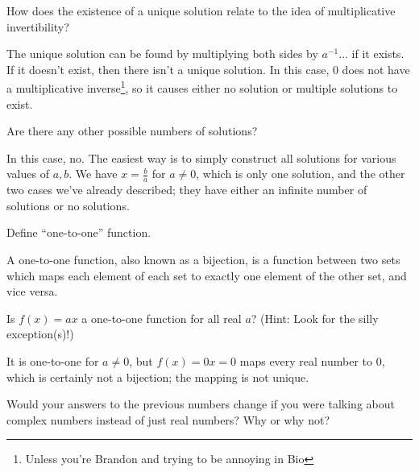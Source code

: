 \documentclass[../gatm_answers.tex]{subfiles}
\begin{document}
\begin{inner_problem}
\item How does the existence of a unique solution relate to the idea of multiplicative invertibility?
\end{inner_problem}

The unique solution can be found by multiplying both sides by $a^{-1}$... if it exists. If it doesn't exist, then there isn't a unique solution. In this case, $0$ does not have a multiplicative inverse\footnote{Unless you're Brandon and trying to be annoying in Bio}, so it causes either no solution or multiple solutions to exist.

\begin{inner_problem}
\item Are there any other possible numbers of solutions?
\end{inner_problem}

In this case, no. The easiest way is to simply construct all solutions for various values of $a,b$. We have $x=\frac{b}{a}$ for $a\neq 0$, which is only one solution, and the other two cases we've already described; they have either an infinite number of solutions or no solutions.

\begin{outer_problem}
\item
\end{outer_problem}

\begin{inner_problem}[start=1]
\item Define ``one-to-one'' function.
\end{inner_problem}

A one-to-one function, also known as a bijection, is a function between two sets which maps each element of each set to exactly one element of the other set, and vice versa.

\begin{inner_problem}
\item Is $f(x)=ax$ a one-to-one function for all real $a$? (Hint: Look for the silly exception(s)!)
\end{inner_problem}

It is one-to-one for $a\neq 0$, but $f(x)=0x=0$ maps every real number to $0$, which is certainly not a bijection; the mapping is not unique.

\begin{outer_problem}
\item Would your answers to the previous numbers change if you were talking about complex numbers instead of just real numbers? Why or why not?
\end{outer_problem}
\end{document}
